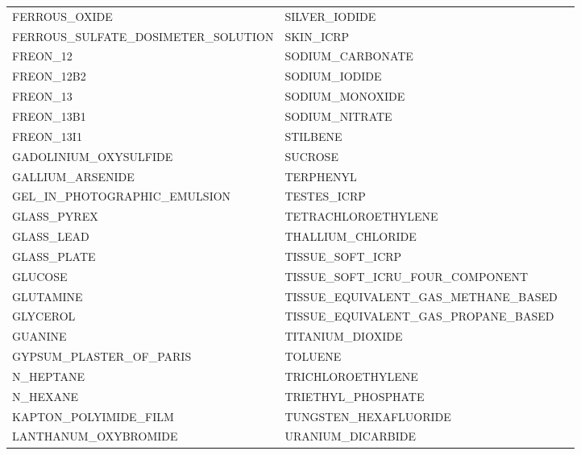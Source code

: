 \begin{center}
\begin{longtable}{lll}
FERROUS_OXIDE                       & SILVER_IODIDE                             \\
FERROUS_SULFATE_DOSIMETER_SOLUTION  & SKIN_ICRP                                 \\
FREON_12                            & SODIUM_CARBONATE                          \\
FREON_12B2                          & SODIUM_IODIDE                             \\
FREON_13                            & SODIUM_MONOXIDE                           \\
FREON_13B1                          & SODIUM_NITRATE                            \\
FREON_13I1                          & STILBENE                                  \\
GADOLINIUM_OXYSULFIDE               & SUCROSE                                   \\
GALLIUM_ARSENIDE                    & TERPHENYL                                 \\
GEL_IN_PHOTOGRAPHIC_EMULSION        & TESTES_ICRP                               \\
GLASS_PYREX                         & TETRACHLOROETHYLENE                       \\
GLASS_LEAD                          & THALLIUM_CHLORIDE                         \\
GLASS_PLATE                         & TISSUE_SOFT_ICRP                          \\
GLUCOSE                             & TISSUE_SOFT_ICRU_FOUR_COMPONENT           \\
GLUTAMINE                           & TISSUE_EQUIVALENT_GAS_METHANE_BASED       \\
GLYCEROL                            & TISSUE_EQUIVALENT_GAS_PROPANE_BASED       \\
GUANINE                             & TITANIUM_DIOXIDE                          \\
GYPSUM_PLASTER_OF_PARIS             & TOLUENE                                   \\
N_HEPTANE                           & TRICHLOROETHYLENE                         \\
N_HEXANE                            & TRIETHYL_PHOSPHATE                        \\
KAPTON_POLYIMIDE_FILM               & TUNGSTEN_HEXAFLUORIDE                     \\
LANTHANUM_OXYBROMIDE                & URANIUM_DICARBIDE                         \\

\end{longtable}
\end{center}

